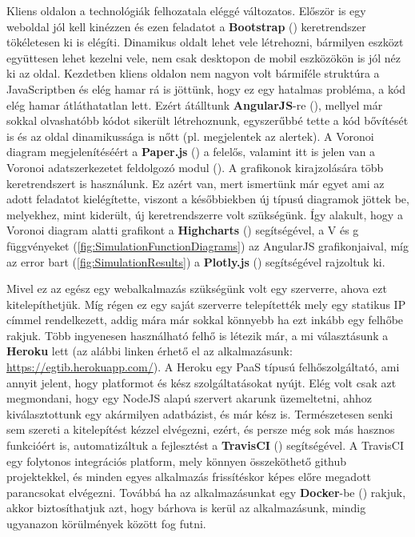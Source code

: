 Kliens oldalon a technológiák felhozatala eléggé változatos. Először is egy weboldal jól kell kinézzen és ezen feladatot a \textbf{Bootstrap} (\cite{soft:bootstrap}) keretrendszer tökéletesen ki is elégíti. Dinamikus oldalt lehet vele létrehozni, bármilyen eszközt együttesen lehet kezelni vele, nem csak desktopon de mobil eszközökön is jól néz ki az oldal. Kezdetben kliens oldalon nem nagyon volt bármiféle struktúra a JavaScriptben és elég hamar rá is jöttünk, hogy ez egy hatalmas probléma, a kód elég hamar átláthatatlan lett. Ezért átálltunk \textbf{AngularJS}-re (\cite{soft:angular}), mellyel már sokkal olvashatóbb kódot sikerült létrehoznunk, egyszerűbbé tette a kód bővítését is és az oldal dinamikussága is nőtt (pl. megjelentek az alertek). A Voronoi diagram megjelenítéséért a \textbf{Paper.js} (\cite{soft:paper}) a felelős, valamint itt is jelen van a Voronoi adatszerkezetet feldolgozó modul (\cite{soft:voronoiModule}). A grafikonok kirajzolására több keretrendszert is használunk. Ez azért van, mert ismertünk már egyet ami az adott feladatot kielégítette, viszont a későbbiekben új típusú diagramok jöttek be, melyekhez, mint kiderült, új keretrendszerre volt szükségünk. Így alakult, hogy a Voronoi diagram alatti grafikont a \textbf{Highcharts} (\cite{soft:highcharts}) segítségével, a V és g függvényeket (\ref{fig:SimulationFunctionDiagrams}) az AngularJS grafikonjaival, míg az error bart (\ref{fig:SimulationResults}) a \textbf{Plotly.js} (\cite{soft:plotly}) segítségével rajzoltuk ki.

Mivel ez az egész egy webalkalmazás szükségünk volt egy szerverre, ahova ezt kitelepíthetjük. Míg régen ez egy saját szerverre telepítették mely egy statikus IP címmel rendelkezett, addig mára már sokkal könnyebb ha ezt inkább egy felhőbe rakjuk. Több ingyenesen használható felhő is létezik már, a mi választásunk a \textbf{Heroku} lett (az alábbi linken érhető el az alkalmazásunk: \url{https://egtib.herokuapp.com/}). A Heroku egy PaaS típusú felhőszolgáltató, ami annyit jelent, hogy platformot és kész szolgáltatásokat nyújt. Elég volt csak azt megmondani, hogy egy NodeJS alapú szervert akarunk üzemeltetni, ahhoz kiválasztottunk egy akármilyen adatbázist, és már kész is. Természetesen senki sem szereti a kitelepítést kézzel elvégezni, ezért, és persze még sok más hasznos funkcióért is, automatizáltuk a fejlesztést a \textbf{TravisCI} (\cite{soft:travis}) segítségével. A TravisCI egy folytonos integrációs platform, mely könnyen összeköthető github projektekkel, és minden egyes alkalmazás frissítéskor képes előre megadott parancsokat elvégezni. Továbbá ha az alkalmazásunkat egy \textbf{Docker}-be (\cite{soft:docker}) rakjuk, akkor biztosíthatjuk azt, hogy bárhova is kerül az alkalmazásunk, mindig ugyanazon körülmények között fog futni.

